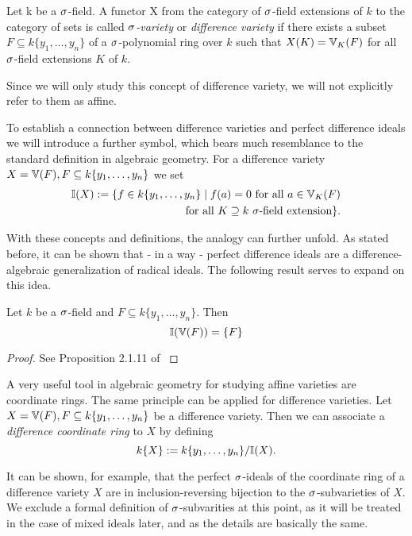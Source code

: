 \begin{defn}
Let k be a $\sigma$-field. A functor X from the category of $\sigma$-field extensions of $k$ to the category of sets is called \emph{$\sigma$-variety} or \emph{difference variety} 
 if there exists a subset $F \subseteq k\{y_1,\ldots,y_n\}$ of a $\sigma$-polynomial ring over $k$ such that $X(K) = \mathbb{V}_K(F)$ for all $\sigma$-field extensions $K$ of $k$.
\end{defn}

Since we will only study this concept of difference variety, we will not explicitly refer to them as affine.

To establish a connection between difference varieties and perfect difference ideals we will introduce a further symbol, which bears much resemblance to the standard definition in algebraic geometry.
For a difference variety $X = \mathbb{V}(F), F \subseteq k\{y_1,\ldots,y_n\}$ we set 
\begin{align*} \mathbb{I}(X) := \{ f \in k\{y_1,\ldots,y_n \} \mid f(a) = 0 \text{ for all } a \in \mathbb{V}_K(F) \\ \text{ for all } K \supseteq k ~ \sigma \text{-field extension} \}. \end{align*}

With these concepts and definitions, the analogy can further unfold. As stated before, it can be shown that - in a way - perfect difference ideals are a difference-algebraic generalization of radical ideals. The following result serves to expand on this idea.

\begin{prop}
Let $k$ be a $\sigma$-field and $F \subseteq k\{y_1,\ldots,y_n\}$. Then 
$$ \mathbb{I}(\mathbb{V}(F)) = \{F\}$$
\begin{proof}
See Proposition 2.1.11 of \cite{wibmer}
\end{proof}
\end{prop}

A very useful tool in algebraic geometry for studying affine varieties are coordinate rings. The same principle can be applied for difference varieties. Let $X = \mathbb{V}(F), F \subseteq k\{y_1,\ldots,y_n\}$  be a difference variety.
Then we can associate a \emph{difference coordinate ring}  to $X$ by 
defining $$ k\{X\} := k\{y_1,\ldots,y_n\}/\mathbb{I}(X).$$


It can be shown, for example, that the perfect $\sigma$-ideals of the coordinate ring of a difference variety $X$
are in inclusion-reversing bijection to the $\sigma$-subvarieties of $X$. We exclude a formal definition of $\sigma$-subvarities at this point, as it will be treated in the case of mixed ideals later, and as the details are basically the same.


